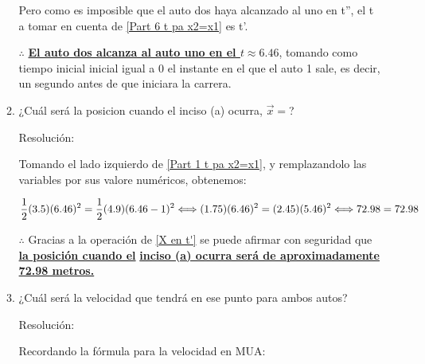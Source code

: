 \documentclass[12pt,letterpaper]{article}
\begin{document}
\begin{enumerate}
\begin{enumerate}
            Pero como es imposible que el auto dos haya alcanzado al uno en t'', el t a tomar en cuenta de \ref{Part 6 t pa x2=x1} es t'.\newline

            $\therefore$ \textbf{\underline{El auto dos alcanza al auto uno en el $t\approx 6.46$}}, tomando como tiempo inicial inicial igual a 0 el instante en el que el auto 1 sale, es decir, un segundo antes de que iniciara la carrera.\newline

            \item ¿Cuál será la posicion cuando el inciso (a) ocurra, $\vec{x}=$?\newline

            Resolución:\newline

            Tomando el lado izquierdo de \ref{Part 1 t pa x2=x1}, y remplazandolo las variables por sus valore numéricos, obtenemos:

                \begin{equation}
                    \label{X en t'}
                    \frac{1}{2}(3.5)(6.46)^{2}
                    =
                    \frac{1}{2}(4.9)(6.46-1)^{2}\\ \\
                    \Longleftrightarrow \\ \\
                    (1.75)(6.46)^{2}
                    =
                    (2.45)(5.46)^{2}\\ \\
                    \Longleftrightarrow \\ \\
                    72.98=72.98
                \end{equation}

            $\therefore$ Gracias a la operación de \ref{X en t'} se puede afirmar con seguridad que \textbf{\underline{la posición cuando el}} \textbf{\underline{inciso (a) ocurra será de aproximadamente 72.98 metros.}}\newline
            
            \item ¿Cuál será la velocidad que tendrá en ese punto para ambos autos?\newline

            Resolución:\newline

            Recordando la fórmula para la velocidad en MUA:


\end{enumerate}
\end{enumerate}
\end{document}
